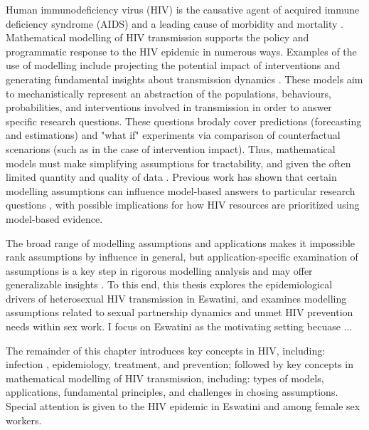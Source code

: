 Human immunodeficiency virus (HIV) is
the causative agent of acquired immune deficiency syndrome (AIDS)
and a leading cause of morbidity and mortality \cite{Maartens2014,GBD2019}.
Mathematical modelling of HIV transmission supports the policy and programmatic response to the HIV epidemic in numerous ways. 
Examples of the use of modelling include 
projecting the potential impact of interventions \cite{Eaton2012} and
generating fundamental insights about transmission dynamics \cite{Garnett1993}.
These models aim to mechanistically represent an abstraction of
the populations, behaviours, probabilities, and interventions
involved in transmission \cite{Garnett2011} in order to answer specific research questions.
These questions brodaly cover predictions (forecasting and estimations) and "what if" experiments via comparison of counterfactual scenarions (such as in the case of intervention impact).
Thus, mathematical models must make simplifying assumptions for tractability, %
and given the often limited quantity and quality of data \cite{Mishra2016,Garnett2011}. %
Previous work has shown that certain modelling assumptions can influence
model-based answers to particular research questions
\cite{Garnett1993,Hontelez2013,Mishra2016,Johnson2016mf,Bernard2017,Knight2020},
with possible implications for how HIV resources are prioritized using model-based evidence.
\par
The broad range of modelling assumptions and applications
makes it impossible rank assumptions by influence in general,
but application-specific examination of assumptions
is a key step in rigorous modelling analysis
and may offer generalizable insights \cite{Suen2017}. %
To this end, this thesis explores the epidemiological drivers of heterosexual HIV transmission in Eswatini, %
and examines modelling assumptions related to
sexual partnership dynamics and unmet HIV prevention needs within sex work. %
I focus on Eswatini as the motivating setting becuase ... %
\par
The remainder of this chapter introduces key concepts in HIV, including:
infection %
, epidemiology, treatment, and prevention;
followed by key concepts in mathematical modelling of HIV transmission, including:
types of models, applications, fundamental principles, and challenges in chosing assumptions.
Special attention is given to the HIV epidemic in Eswatini and among female sex workers. %
